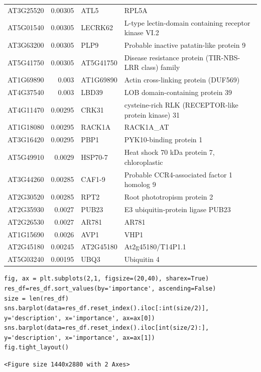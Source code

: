 \documentclass[11pt]{article}
\begin{document}
\begin{center}
\begin{tabular}{lrll}
AT3G25520 & 0.00305 & ATL5 & RPL5A\\
AT5G01540 & 0.00305 & LECRK62 & L-type lectin-domain containing receptor kinase VI.2\\
AT3G63200 & 0.00305 & PLP9 & Probable inactive patatin-like protein 9\\
AT5G41750 & 0.00305 & AT5G41750 & Disease resistance protein (TIR-NBS-LRR class) family\\
AT1G69890 & 0.003 & AT1G69890 & Actin cross-linking protein (DUF569)\\
AT4G37540 & 0.003 & LBD39 & LOB domain-containing protein 39\\
AT4G11470 & 0.00295 & CRK31 & cysteine-rich RLK (RECEPTOR-like protein kinase) 31\\
AT1G18080 & 0.00295 & RACK1A & RACK1A\_AT\\
AT3G16420 & 0.00295 & PBP1 & PYK10-binding protein 1\\
AT5G49910 & 0.0029 & HSP70-7 & Heat shock 70 kDa protein 7, chloroplastic\\
AT3G44260 & 0.00285 & CAF1-9 & Probable CCR4-associated factor 1 homolog 9\\
AT2G30520 & 0.00285 & RPT2 & Root phototropism protein 2\\
AT2G35930 & 0.0027 & PUB23 & E3 ubiquitin-protein ligase PUB23\\
AT2G26530 & 0.0027 & AR781 & AR781\\
AT1G15690 & 0.0026 & AVP1 & VHP1\\
AT2G45180 & 0.00245 & AT2G45180 & At2g45180/T14P1.1\\
AT5G03240 & 0.00195 & UBQ3 & Ubiquitin 4\\
\end{tabular}
\end{center}

\begin{verbatim}
fig, ax = plt.subplots(2,1, figsize=(20,40), sharex=True)
res_df=res_df.sort_values(by='importance', ascending=False)
size = len(res_df)
sns.barplot(data=res_df.reset_index().iloc[:int(size/2)], y='description', x='importance', ax=ax[0])
sns.barplot(data=res_df.reset_index().iloc[int(size/2):], y='description', x='importance', ax=ax[1])
fig.tight_layout()
\end{verbatim}

\begin{verbatim}
<Figure size 1440x2880 with 2 Axes>
\end{verbatim}
\end{document}
